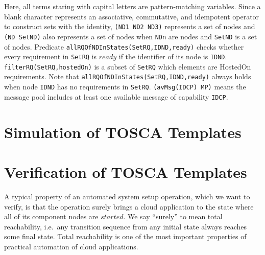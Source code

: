 \documentclass[12pt]{report}
\newcommand{\stt}[1]{{\small{\tt {#1}}}}
\begin{document}
\normalsize
Here, all terms staring with capital letters are pattern-matching
variables. Since a blank character represents an associative,
commutative, and idempotent operator to construct sets with the
identity, \stt{(ND1 ND2 ND3)} represents a set of nodes and
\stt{(ND SetND)} also represents a set of nodes when
{\tt NDn} are nodes and {\tt SetND} is a set of nodes.  Predicate
\stt{allRQOfNDInStates(SetRQ,IDND,ready)} checks whether every
requirement in {\tt SetRQ} is $ready$ if the identifier of its
node is {\tt IDND}. \stt{filterRQ(SetRQ,hostedOn)} is a subset of
{\tt SetRQ} which elements are HostedOn requirements.
Note that \stt{allRQOfNDInStates(SetRQ,IDND,ready)} always holds
when node {\tt IDND} has no requirements in {\tt SetRQ}.
\stt{(avMsg(IDCP) MP)} means the message pool includes at least
one available message of capability {\tt IDCP}.
\section{Simulation of TOSCA Templates}
\label{sec:TOSCAsimulation}
\section{Verification of TOSCA Templates}
\label{sec:TOSCAverification}
A typical property of an automated system setup operation, which we
want to verify, is that the operation surely brings a cloud
application to the state where all of its component nodes are $started$.
We say ``surely'' to mean total reachability, i.e.\ any transition
sequence from any initial state always reaches some final state. Total
reachability is one of the most important properties of practical
automation of cloud applications.
\end{document}

